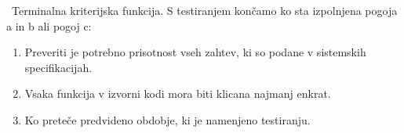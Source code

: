 \documentclass[a4paper,12pt]{article}
\begin{document}
\begin{enumerate}[label=\alph*)]
					\ Terminalna kriterijska funkcija. S testiranjem končamo ko sta izpolnjena pogoja a in b ali pogoj c:

					\begin{enumerate}
						\item Preveriti je potrebno prisotnost vseh zahtev, ki so podane v sistemskih specifikacijah. 
						\item Vsaka funkcija v izvorni kodi mora biti klicana najmanj enkrat.
						\item Ko preteče predvideno obdobje, ki je namenjeno testiranju.
					\end{enumerate}


				

			
			\end{enumerate}

							
\newpage
\end{document}

